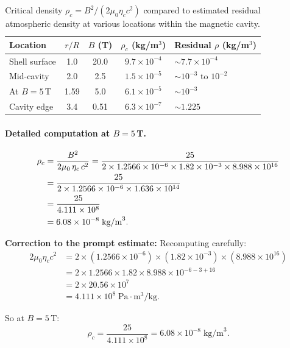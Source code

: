 \documentclass[12pt,a4paper]{article}
\begin{document}
\begin{table}[h]
\centering
\begin{tabular}{@{}lcccl@{}}
\toprule
Location & $r/R$ & $B$ (T) & $\rho_c$ (kg/m$^3$) & Residual $\rho$ (kg/m$^3$) \\
\midrule
Shell surface & 1.0 & 20.0 & $9.7 \times 10^{-4}$ & $\sim 7.7 \times 10^{-4}$ \\
Mid-cavity     & 2.0 & 2.5  & $1.5 \times 10^{-5}$ & $\sim 10^{-3}$ to $10^{-2}$ \\
At $B=5$\,T    & 1.59 & 5.0 & $6.1 \times 10^{-5}$ & $\sim 10^{-3}$ \\
Cavity edge    & 3.4 & 0.51 & $6.3 \times 10^{-7}$ & $\sim 1.225$ \\
\bottomrule
\end{tabular}
\caption{Critical density $\rho_c = B^2/(2\mu_0 \eta_c c^2)$ compared to estimated
residual atmospheric density at various locations within the magnetic cavity.}
\label{tab:threshold}
\end{table}

\paragraph{Detailed computation at $B = 5$\,T.}
\begin{align}
  \rho_c &= \frac{B^2}{2\mu_0 \, \eta_c \, c^2}
    = \frac{25}{2 \times 1.2566\times10^{-6} \times 1.82\times10^{-3} \times 8.988\times10^{16}} \notag \\
    &= \frac{25}{2 \times 1.2566\times10^{-6} \times 1.636\times10^{14}} \notag \\
    &= \frac{25}{4.111\times10^{8}} \notag \\
    &= 6.08 \times 10^{-8} \; \text{kg/m}^3. \label{eq:rhoc_5T_corrected}
\end{align}

\textbf{Correction to the prompt estimate:} Recomputing carefully:
\begin{align}
  2\mu_0 \eta_c c^2 &= 2 \times (1.2566\times10^{-6}) \times (1.82\times10^{-3}) \times (8.988\times10^{16}) \\
    &= 2 \times 1.2566 \times 1.82 \times 8.988 \times 10^{-6-3+16} \\
    &= 2 \times 20.56 \times 10^{7} \\
    &= 4.111 \times 10^{8} \; \text{Pa}\cdot\text{m}^3/\text{kg}.
\end{align}

So at $B = 5$\,T:
\begin{equation}
  \rho_c = \frac{25}{4.111 \times 10^8} = 6.08 \times 10^{-8} \; \text{kg/m}^3.
\end{equation}
\end{document}
